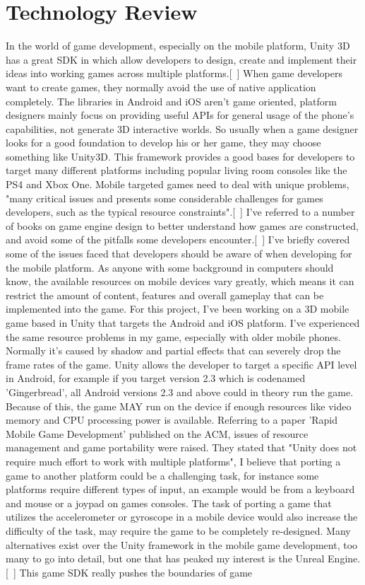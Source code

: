 \chapter{Technology Review}
In the world of game development, especially on the mobile platform, Unity 3D has a great SDK in which allow developers to design, create and implement their ideas into working games across multiple platforms.[~\cite{Unity3D}] When game developers want to create games, they normally avoid the use of native application completely. The libraries in Android and iOS aren't game oriented, platform designers mainly focus on providing useful APIs for general usage of the phone's capabilities, not generate 3D interactive worlds. So usually when a game designer looks for a good foundation to develop his or her game, they may choose something like Unity3D. This framework provides a good bases for developers to target many different platforms including popular living room consoles like the PS4 and Xbox One. Mobile targeted games need to deal with unique problems, "many critical issues and presents some considerable challenges for games developers, such as the typical resource constraints".[~\cite{Game-Engine-Architecture}] I've referred to a number of books on game engine design to better understand how games are constructed, and avoid some of the pitfalls some developers encounter.[~\cite{RAD-Game-Development}] I've briefly covered some of the issues faced that developers should be aware of when developing for the mobile platform. As anyone with some background in computers should know, the available resources on mobile devices vary greatly, which means it can restrict the amount of content, features and overall gameplay that can be implemented into the game. For this project, I've been working on a 3D mobile game based in Unity that targets the Android and iOS platform. I've experienced the same resource problems in my game, especially with older mobile phones. Normally it’s caused by shadow and partial effects that can severely drop the frame rates of the game. Unity allows the developer to target a specific API level in Android, for example if you target version 2.3 which is codenamed 'Gingerbread', all Android versions 2.3 and above could in theory run the game. Because of this, the game MAY run on the device if enough resources like video memory and CPU processing power is available. Referring to a paper 'Rapid Mobile Game Development' published on the ACM, issues of resource management and game portability were raised. They stated that "Unity does not require much effort to work with multiple platforms", I believe that porting a game to another platform could be a challenging task, for instance some platforms require different types of input, an example would be from a keyboard and mouse or a joypad on games consoles. The task of porting a game that utilizes the accelerometer or gyroscope in a mobile device would also increase the difficulty of the task, may require the game to be completely re-designed. Many alternatives exist over the Unity framework in the mobile game development, too many to go into detail, but one that has peaked my interest is the Unreal Engine.[~\cite{Unreal-Engine}] This game SDK really pushes the boundaries of game 